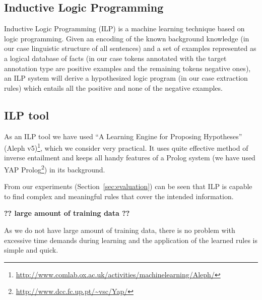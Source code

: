 \subsection{Inductive Logic Programming}
Inductive Logic Programming (ILP) \citep{dedek:MuggletonILP} is a machine learning technique based on logic programming. Given an encoding of the known background knowledge (in our case linguistic structure of all sentences) and a set of examples represented as a logical database of facts (in our case tokens annotated with the target annotation type are positive examples and the remaining tokens negative ones), an ILP system will derive a hypothesized logic program (in our case extraction rules) which entails all the positive and none of the negative examples.

\subsection{ILP tool}
As an ILP tool we have used ``A Learning Engine for Proposing Hypotheses'' (Aleph v5)\footnote{\url{http://www.comlab.ox.ac.uk/activities/machinelearning/Aleph/}}, which we consider very practical. It uses quite effective method of inverse entailment \citep{biblio:InverseEntailment} and keeps all handy features of a Prolog system (we have used YAP Prolog\footnote{\url{http://www.dcc.fc.up.pt/~vsc/Yap/}}) in its background.


From our experiments (Section~\ref{sec:evaluation}) can be seen that ILP is capable to find complex and meaningful rules that cover the intended information.



\textbf{?? large amount of training data ??}

As we do not have large amount of training data, there is no problem with excessive time demands during learning and the application of the learned rules is simple and quick.



